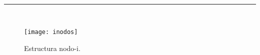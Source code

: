 
\begin{center}
	{\fboxrule=4pt } \\
	\setcounter{chapter}{3}
	\setcounter{section}{0}
	\rule{15cm}{0pt} \\
\end{center}
\begin{figure}[H]
	\texttt{[image: inodos]}
	\centering
	\caption{Estructura nodo-i.}
    	\label{fig:inodos}
\end{figure}



\newpage
